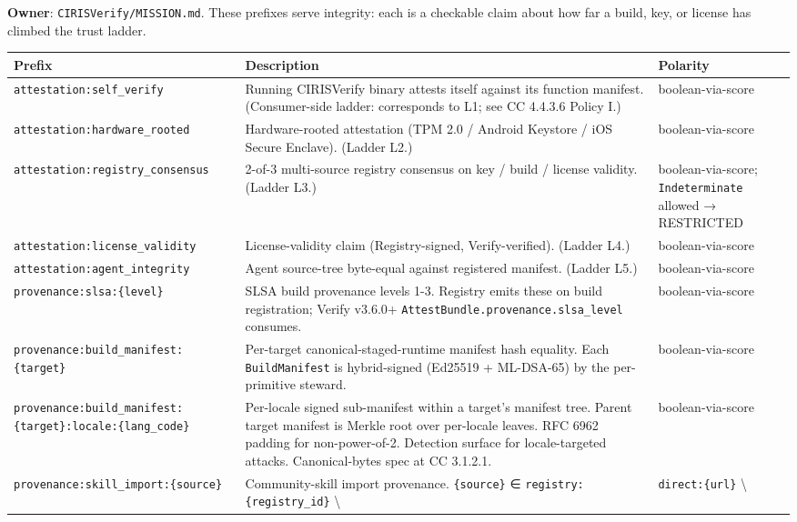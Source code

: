 \documentclass[11pt]{article}
\begin{document}
\textbf{Owner}: \texttt{CIRISVerify/MISSION.md}. These prefixes serve integrity: each is a checkable claim about how far a build, key, or license has climbed the trust ladder.


{\footnotesize
\begin{longtable}{|p{5.33cm}|p{5.33cm}|p{5.33cm}|}\hline
\textbf{Prefix} & \textbf{Description} & \textbf{Polarity} \\ \hline\endhead
\texttt{attestation:self\_verify} & Running CIRISVerify binary attests itself against its function manifest. (Consumer-side ladder: corresponds to L1; see CC 4.4.3.6 Policy I.) & boolean-via-score \\ \hline
\texttt{attestation:hardware\_rooted} & Hardware-rooted attestation (TPM 2.0 / Android Keystore / iOS Secure Enclave). (Ladder L2.) & boolean-via-score \\ \hline
\texttt{attestation:registry\_consensus} & 2-of-3 multi-source registry consensus on key / build / license validity. (Ladder L3.) & boolean-via-score; \texttt{Indeterminate} allowed → RESTRICTED \\ \hline
\texttt{attestation:license\_validity} & License-validity claim (Registry-signed, Verify-verified). (Ladder L4.) & boolean-via-score \\ \hline
\texttt{attestation:agent\_integrity} & Agent source-tree byte-equal against registered manifest. (Ladder L5.) & boolean-via-score \\ \hline
\texttt{provenance:slsa:\{level\}} & SLSA build provenance levels 1-3. Registry emits these on build registration; Verify v3.6.0+ \texttt{AttestBundle.provenance.slsa\_level} consumes. & boolean-via-score \\ \hline
\texttt{provenance:build\_manifest:\{target\}} & Per-target canonical-staged-runtime manifest hash equality. Each \texttt{BuildManifest} is hybrid-signed (Ed25519 + ML-DSA-65) by the per-primitive steward. & boolean-via-score \\ \hline
\texttt{provenance:build\_manifest:\{target\}:locale:\{lang\_code\}} & Per-locale signed sub-manifest within a target's manifest tree. Parent target manifest is Merkle root over per-locale leaves. RFC 6962 padding for non-power-of-2. Detection surface for locale-targeted attacks. Canonical-bytes spec at CC 3.1.2.1. & boolean-via-score \\ \hline
\texttt{provenance:skill\_import:\{source\}} & Community-skill import provenance. \texttt{\{source\}} ∈ \texttt{registry:\{registry\_id\}} \textbackslash{} & \texttt{direct:\{url\}} \textbackslash{} \\ \hline

\end{longtable}}
\end{document}
